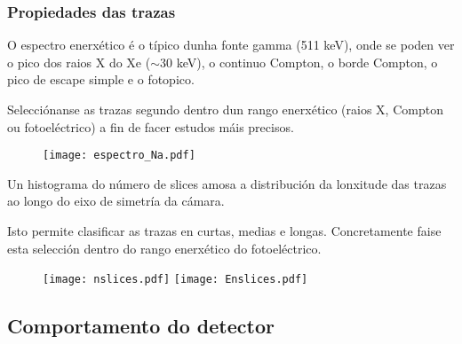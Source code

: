 \documentclass[10pt]{beamer}
\begin{document}
\begin{frame}[allowframebreaks]\frametitle{Propiedades das trazas}

\bi \justifying
\item O espectro enerxético é o típico dunha fonte gamma (511 keV), onde se poden ver o pico dos raios X do Xe ($\sim$30 keV), o continuo Compton, o borde Compton, o pico de escape simple e o fotopico.
\item Selecciónanse as trazas segundo dentro dun rango enerxético (raios X, Compton ou fotoeléctrico) a fin de facer estudos máis precisos.
\ei

\vspace{-0.5cm}
\begin{figure}
\centering
\texttt{[image: espectro\_Na.pdf]}
\end{figure}
 
\bi \justifying
\item Un histograma do número de slices amosa a distribución da lonxitude das trazas ao longo do eixo de simetría da cámara.
\item Isto permite clasificar as trazas en curtas, medias e longas. Concretamente faise esta selección dentro do rango enerxético do fotoeléctrico.
\ei

 \begin{figure}
 \centering
 \texttt{[image: nslices.pdf]}
 \texttt{[image: Enslices.pdf]}
 \end{figure}

\end{frame}
\subsection{Comportamento do detector}
\end{document}
